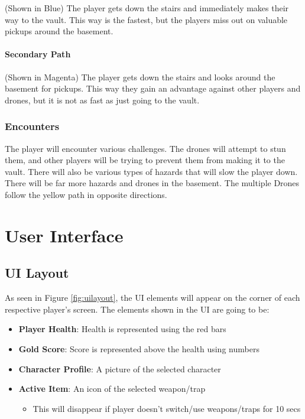 \documentclass[14pt]{report}
\begin{document}
(Shown in Blue) The player gets down the stairs and immediately makes their way to the vault. This way is the fastest, but the players miss out on valuable pickups around the basement.

\subsubsection{Secondary Path}

(Shown in Magenta) The player gets down the stairs and looks around the basement for pickups. This way they gain an advantage against other players and drones, but it is not as fast as just going to the vault.


\subsection{Encounters}

The player will encounter various challenges. The drones will attempt to stun them, and other players will be trying to prevent them from making it to the vault. There will also be various types of hazards that will slow the player down. There will be far more hazards and drones in the basement. The multiple Drones follow the yellow path in opposite directions.


\chapter{User Interface}

\section{UI Layout}

As seen in Figure \ref{fig:uilayout}, the UI elements will appear on the corner of each respective player's screen. The elements shown in the UI are going to be:

\begin{itemize}
\item \textbf{Player Health}: Health is represented using the red bars
\item \textbf{Gold Score}: Score is represented above the health using numbers
\item \textbf{Character Profile}: A picture of the selected character
\item \textbf{Active Item}: An icon of the selected weapon/trap 
    \begin{itemize}
        \item This will disappear if player doesn’t switch/use weapons/traps for 10 secs
    \end{itemize}
\end{itemize}
\end{document}
